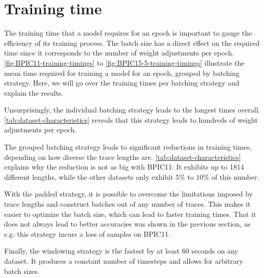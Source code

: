 \section{Training time}\label{sec:eval:training-time}
The training time that a model requires for an epoch is important to gauge the efficiency of its training process. The batch size has a direct effect on the required time since it corresponds to the number of weight adjustments per epoch. \autoref{fig:BPIC11-training-timings} to \autoref{fig:BPIC15-5-training-timings} illustrate the mean time required for training a model for an epoch, grouped by batching strategy. Here, we will go over the training times per batching strategy and explain the results.

Unsurprisingly, the individual batching strategy leads to the longest times overall. \autoref{tab:dataset-characteristics} reveals that this strategy leads to hundreds of weight adjustments per epoch.

The grouped batching strategy leads to significant reductions in training times, depending on how diverse the trace lengths are. \autoref{tab:dataset-characteristics} explains why the reduction is not as big with BPIC11: It exhibits up to 1814 different lengths, while the other datasets only exhibit $5\%$ to $10\%$ of this number.

With the padded strategy, it is possible to overcome the limitations imposed by trace lengths and construct batches out of any number of traces. This makes it easier to optimize the batch size, which can lead to faster training times. That it does not always lead to better accuracies was shown in the previous section, as e.g. this strategy incurs a loss of samples on BPIC11.

Finally, the windowing strategy is the fastest by at least 60 seconds on any dataset. It produces a constant number of timesteps and allows for arbitrary batch sizes.

